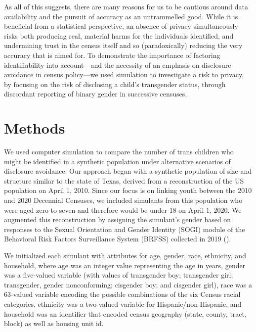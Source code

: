 \documentclass{jpc} %
\theoremstyle{plain}\newtheorem{satz}[thm]{Satz} %
\begin{document}
As all of this suggests, there are many reasons for us to be cautious around data availability and the pursuit of accuracy as an untrammelled good. While it is beneficial from a statistical perspective, an absence of privacy simultaneously risks both producing real, material harms for the individuals identified, and undermining trust in the census itself and so (paradoxically) reducing the very accuracy that is aimed for. To demonstrate the importance of factoring identifiability into account---and the necessity of an emphasis on disclosure avoidance in census policy---we used simulation to investigate a risk to privacy, by focusing on the risk of disclosing a child's transgender status, through discordant reporting of binary gender in successive censuses.

\section*{Methods}

We used computer simulation to compare the number of trans children who might be identified in a synthetic population under alternative scenarios of disclosure avoidance.  Our approach began with a synthetic population of size and structure similar to the state of Texas, derived from a reconstruction of the US population on April 1, 2010.  Since our focus is on linking youth between the 2010 and 2020 Decennial Censuses, we included simulants from this population who were aged zero to seven and therefore would be under 18 on April 1, 2020.  We augmented this reconstruction by assigning the simulant's gender based on responses to the Sexual Orientation and Gender Identity (SOGI) module of the Behavioral Risk Factors Surveillance System (BRFSS) collected in 2019 (\cite{brfss2019}). %

We initialized each simulant with attributes for age, gender, race, ethnicity, and household, where age was an integer value representing the age in years, gender was a five-valued variable (with values of transgender boy; transgender girl; transgender, gender nonconforming; cisgender boy; and cisgender girl), race was a 63-valued variable encoding the possible combinations of the six Census racial categories, ethnicity was a two-valued variable for Hispanic/non-Hispanic, and household was an identifier that encoded census geography (state, county, tract, block) as well as housing unit id.
\end{document}
